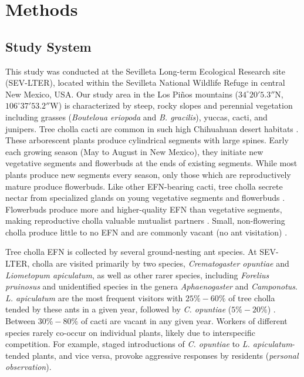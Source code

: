 \documentclass[11pt]{article}
\begin{document}
\section*{Methods}
\subsection*{Study System}
  
This study was conducted at the Sevilleta Long-term Ecological Research site (SEV-LTER), located within the Sevilleta National Wildlife Refuge in central New Mexico, USA.
Our study area in the Los Pi\~nos mountains ($34^\circ20'5.3''$N, $106^\circ37'53.2''$W) is characterized by steep, rocky slopes and perennial vegetation including grasses (\textit{Bouteloua eriopoda} and \textit{B. gracilis}), yuccas, cacti, and junipers. 
Tree cholla cacti are common in such high Chihuahuan desert habitats \citep{Benson1982}. 
These arborescent plants produce cylindrical segments with large spines. 
Early each growing season (May to August in New Mexico), they initiate new vegetative segments and flowerbuds at the ends of existing segments. 
While most plants produce new segments every season, only those which are reproductively mature produce flowerbuds. 
Like other EFN-bearing cacti, tree cholla secrete nectar from specialized glands on young vegetative segments and flowerbuds \citep{Ness2006,Oliveira1999}. 
Flowerbuds produce more and higher-quality EFN than vegetative segments, making reproductive cholla valuable mutualist partners \citep{Miller2014}. 
Small, non-flowering cholla produce little to no EFN and are commonly vacant (no ant visitation) \citep{Miller2014}. 

Tree cholla EFN is collected by several ground-nesting ant species. 
At SEV-LTER, cholla are visited primarily by two species, \textit{Crematogaster opuntiae} and \textit{Liometopum apiculatum}, as well as other rarer species, including \textit{Forelius pruinosus} and unidentified species in the genera \textit{Aphaenogaster} and \textit{Camponotus}.
\textit{L. apiculatum} are the most frequent visitors with $25\% - 60\%$ of tree cholla tended by these ants in a given year, followed by \textit{C. opuntiae} ($5\% - 20\%$) \citep{Donald2022}. 
Between $ 30\% - 80\%$ of cacti are vacant in any given year. 
Workers of different species rarely co-occur on individual plants, likely due to interspecific competition. 
For example, staged introductions of \textit{C. opuntiae} to \textit{L. apiculatum}-tended plants, and vice versa, provoke aggressive responses by residents (\textit{personal observation}).
\end{document}

